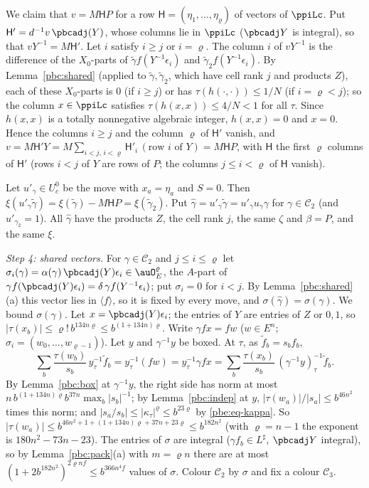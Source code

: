 \documentclass[10pt]{amsart}
\theoremstyle{definition}
\theoremstyle{remark}
\begin{document}
We claim that $v=M\mathsf H P$ for a row $\mathsf H=(\eta_1,\dots,\eta_\varrho)$ of vectors of $\ppiLc$. Put $\mathsf H'=d^{-1}
v\,\pbcadj(Y)$, whose columns lie in $\ppiLc$ ($\pbcadj Y$ is integral), so that $vY^{-1}=M\mathsf H'$. Let $i$
satisfy $i\ge j$ or $i=\varrho$. The column $i$ of $vY^{-1}$ is the difference of the $X_0$-parts of
$\tilde\gamma f(Y^{-1}\epsilon_i)$ and $\tilde\gamma_2f(Y^{-1}\epsilon_i)$. By Lemma~\ref{pbc:shared}
(applied to $\tilde\gamma,\tilde\gamma_2$, which have cell rank $j$ and products $Z$), each of these
$X_0$-parts is $0$ (if $i\ge j$) or has $\tau(h(\cdot,\cdot))\le1/N$ (if $i=\varrho<j$); so the column
$x\in\ppiLc$ satisfies $\tau(h(x,x))\le4/N<1$ for all $\tau$. Since $h(x,x)$ is a totally nonnegative
algebraic integer, $h(x,x)=0$ and $x=0$. Hence the columns $i\ge j$ and the column $\varrho$ of $\mathsf H'$
vanish, and $v=M\mathsf H'Y=M\sum_{i<j,\,i<\varrho}\mathsf H'_i\,(\text{row }i\text{ of }Y)=M\mathsf HP$, with $\mathsf H$ the first
$\varrho$ columns of $\mathsf H'$ (rows $i<j$ of $Y$ are rows of $P$; the columns $j\le i<\varrho$ of $\mathsf H$ vanish).

Let $u'_\gamma\in U_c^0$ be the move with $x_a=\eta_a$ and $S=0$. Then $\xi(u'_\gamma\tilde\gamma)=\xi(
\tilde\gamma)-M\mathsf HP=\xi(\tilde\gamma_2)$. Put $\hat\gamma=u'_\gamma\tilde\gamma=u'_\gamma u_\gamma\gamma$ for
$\gamma\in\mathcal C_2$ (and $u'_{\gamma_2}=1$). All $\hat\gamma$ have the products $Z$, the cell rank $j$,
the same $\zeta$ and $\beta=P$, and the same $\xi$.

\emph{Step 4: shared vectors.} For $\gamma\in\mathcal C_2$ and $j\le i\le\varrho$ let $\sigma_i(\gamma)=
\alpha(\gamma)\,\pbcadj(Y)\epsilon_i\in\auO_E^\varrho$, the $A$-part of $\gamma f(\pbcadj(Y)\epsilon_i)=\delta\,
\gamma f(Y^{-1}\epsilon_i)$; put $\sigma_i=0$ for $i<j$. By Lemma~\ref{pbc:shared}(a) this vector lies in
$\langle f\rangle$, so it is fixed by every move, and $\sigma(\hat\gamma)=\sigma(\gamma)$. We bound
$\sigma(\gamma)$. Let $x=\pbcadj(Y)\epsilon_i$; the entries of $Y$ are entries of $Z$ or $0,1$, so $|\tau(
x_b)|\le\varrho!\,b^{134n\varrho}\le b^{(1+134n)\varrho}$. Write $\gamma fx=fw$ ($w\in E^n$; $\sigma_i=(w_0,
\dots,w_{\varrho-1})$). Let $y$ and $\gamma^{-1}y$ be boxed. At $\tau$, as $\tilde f_b=s_bf_b$,
\[
\sum_b\frac{\tau(w_b)}{s_b}\,y_\tau^{-1}\tilde f_b=y_\tau^{-1}(fw)=y_\tau^{-1}\gamma fx=\sum_b
\frac{\tau(x_b)}{s_b}\,(\gamma^{-1}y)_\tau^{-1}\tilde f_b .
\]
By Lemma~\ref{pbc:box} at $\gamma^{-1}y$, the right side has norm at most $n\,b^{(1+134n)\varrho}b^{37n}
\max_b|s_b|^{-1}$; by Lemma~\ref{pbc:indep} at $y$, $|\tau(w_a)|/|s_a|\le b^{46n^2}$ times this norm; and
$|s_a/s_b|\le|\kappa_\tau|^\varrho\le b^{23\varrho}$ by \eqref{pbe:eq-kappa}. So $|\tau(w_a)|\le b^{46n^2+1+(1+134n)\varrho+37n+
23\varrho}\le b^{182n^2}$ (with $\varrho=n-1$ the exponent is $180n^2-73n-23$). The entries of $\sigma$ are integral ($\gamma f_b\in L^\sharp$, $\pbcadj Y$ integral),
so by Lemma~\ref{pbc:pack}(a) with $m=\varrho n$ there are at most $(1+2b^{182n^2})^{2\varrho nf}\le
b^{366n^4f}$ values of $\sigma$. Colour $\mathcal C_2$ by $\sigma$ and fix a colour $\mathcal C_3$.
\end{document}
